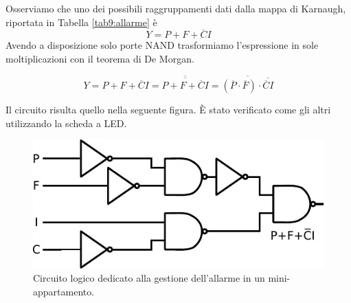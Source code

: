 Osserviamo che uno dei possibili raggruppamenti dati dalla mappa di Karnaugh, riportata in Tabella \ref{tab9:allarme} è
$$Y=P+F+\overline C I$$
Avendo a disposizione solo porte NAND trasformiamo l'espressione in sole moltiplicazioni con il teorema di De Morgan.

$$Y=P+F+\overline C I=\overline{\overline{P+F+\overline C I}}=\overline{(\overline P \cdot \overline F) \cdot \overline{\overline C I}}$$ 

Il circuito risulta quello nella seguente figura.
È stato verificato come gli altri utilizzando la scheda a LED.

\begin{figure}[htpc]
\centering
\includegraphics[width=.65\textwidth]{../E09/latex/allarme.pdf}
\caption{Circuito logico dedicato alla gestione dell'allarme in un mini-appartamento.}
\label{cir9:allarme}
\end{figure}
